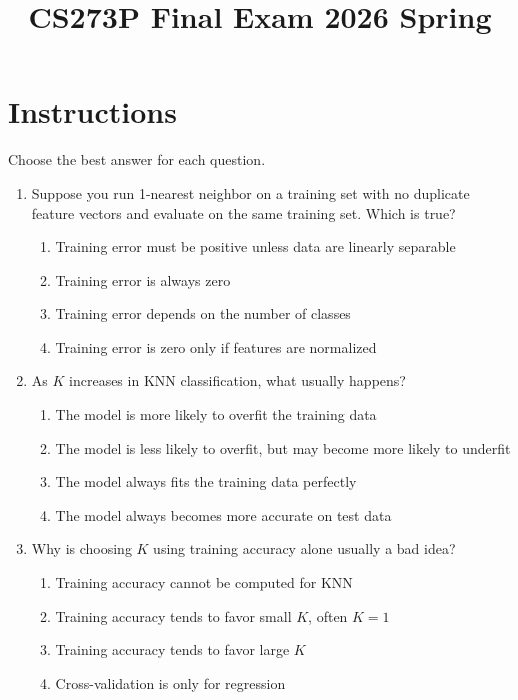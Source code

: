 \documentclass[11pt]{article}
\title{CS273P Final Exam 2026 Spring}
\date{}
\author{}
\newcommand{\cmark}{\ding{51}}
\begin{document}
\maketitle

\section*{Instructions}
Choose the best answer for each question.

\begin{enumerate}[leftmargin=*]

\item Suppose you run 1-nearest neighbor on a training set with no duplicate feature vectors and evaluate on the same training set. Which is true?

\begin{enumerate}[label=\Alph*.]
    \item Training error must be positive unless data are linearly separable
    \item Training error is always zero \cmark
    \item Training error depends on the number of classes
    \item Training error is zero only if features are normalized
\end{enumerate}


\item As $K$ increases in KNN classification, what usually happens?

\begin{enumerate}[label=\Alph*.]
    \item The model is more likely to overfit the training data
    \item The model is less likely to overfit, but may become more likely to underfit \cmark
    \item The model always fits the training data perfectly
    \item The model always becomes more accurate on test data
\end{enumerate}



\item Why is choosing $K$ using training accuracy alone usually a bad idea?

\begin{enumerate}[label=\Alph*.]
    \item Training accuracy cannot be computed for KNN
    \item Training accuracy tends to favor small $K$, often $K=1$ \cmark
    \item Training accuracy tends to favor large $K$
    \item Cross-validation is only for regression
\end{enumerate}


\end{enumerate}
\end{document}
